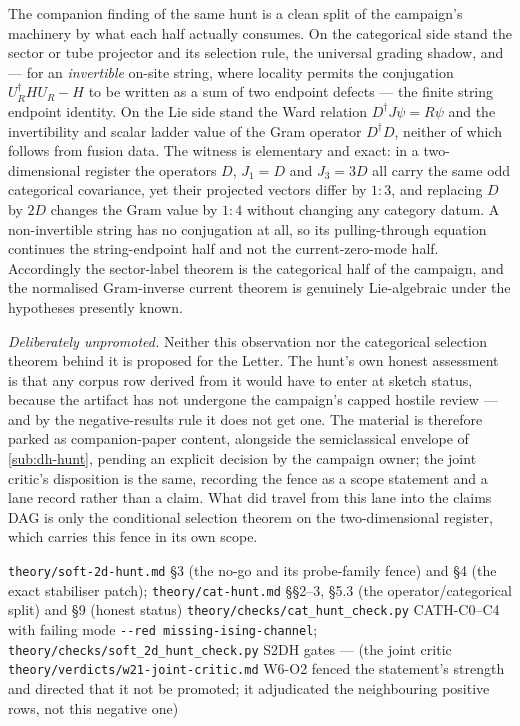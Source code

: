 \begin{observation}
\label{obs:cat-lie-split}
The companion finding of the same hunt is a clean split of the campaign's
machinery by what each half actually consumes. On the categorical side stand
the sector or tube projector and its selection rule, the universal grading
shadow, and — for an \emph{invertible} on-site string, where locality permits
the conjugation $U_R^\dagger H U_R - H$ to be written as a sum of two endpoint
defects — the finite string endpoint identity. On the Lie side stand the Ward
relation $D^\dagger J\psi = R\psi$ and the invertibility and scalar ladder
value of the Gram operator $D^\dagger D$, neither of which follows from fusion
data. The witness is elementary and exact: in a two-dimensional register the
operators $D$, $J_1 = D$ and $J_3 = 3D$ all carry the same odd categorical
covariance, yet their projected vectors differ by $1:3$, and replacing $D$ by
$2D$ changes the Gram value by $1:4$ without changing any category datum. A
non-invertible string has no conjugation at all, so its pulling-through
equation continues the string-endpoint half and not the current-zero-mode half.
Accordingly the sector-label theorem is the categorical half of the campaign,
and the normalised Gram-inverse current theorem is genuinely Lie-algebraic
under the hypotheses presently known.
\end{observation}

\emph{Deliberately unpromoted.} Neither this observation nor the categorical
selection theorem behind it is proposed for the Letter. The hunt's own honest
assessment is that any corpus row derived from it would have to enter at sketch
status, because the artifact has not undergone the campaign's capped hostile
review — and by the negative-results rule it does not get one. The material is
therefore parked as companion-paper content, alongside the semiclassical
envelope of \cref{sub:dh-hunt}, pending an explicit decision by the campaign
owner; the joint critic's disposition is the same, recording the fence as a
scope statement and a lane record rather than a claim. What did travel from
this lane into the claims DAG is only the conditional selection theorem on the
two-dimensional register, which carries this fence in its own scope.

%
{\texttt{theory/soft-2d-hunt.md} §3 (the no-go and its probe-family fence) and §4 (the exact stabiliser patch); \texttt{theory/cat-hunt.md} §§2--3, §5.3 (the operator/categorical split) and §9 (honest status)}%
{\texttt{theory/checks/cat\_hunt\_check.py} CATH-C0--C4 with failing mode \texttt{-{}-red missing-ising-channel}; \texttt{theory/checks/soft\_2d\_hunt\_check.py} S2DH gates}%
{--- (the joint critic \texttt{theory/verdicts/w21-joint-critic.md} W6-O2 fenced the statement's strength and directed that it not be promoted; it adjudicated the neighbouring positive rows, not this negative one)}

